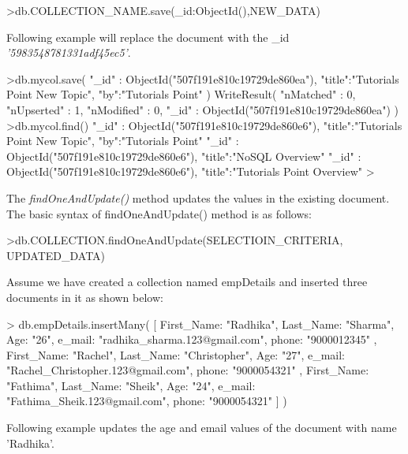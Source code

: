 \documentclass[12pt]{article}
\begin{document}
\begin{bashcode}
>db.COLLECTION_NAME.save({_id:ObjectId(),NEW_DATA})
\end{bashcode}
Following example will replace the document with the \_id
\emph{'5983548781331adf45ec5'}.

\begin{bashcode}
>db.mycol.save(
   {
      "_id" : ObjectId("507f191e810c19729de860ea"), 
        "title":"Tutorials Point New Topic",
      "by":"Tutorials Point"
   }
)
WriteResult({
    "nMatched" : 0,
    "nUpserted" : 1,
    "nModified" : 0,
    "_id" : ObjectId("507f191e810c19729de860ea")
})
>db.mycol.find()
{ "_id" : ObjectId("507f191e810c19729de860e6"), "title":"Tutorials Point New Topic",
   "by":"Tutorials Point"}
{ "_id" : ObjectId("507f191e810c19729de860e6"), "title":"NoSQL Overview"}
{ "_id" : ObjectId("507f191e810c19729de860e6"), "title":"Tutorials Point Overview"}
>
\end{bashcode}

The \emph{findOneAndUpdate()} method updates the values in the existing
document. The basic syntax of findOneAndUpdate() method is as follows:

\begin{bashcode}
>db.COLLECTION.findOneAndUpdate(SELECTIOIN_CRITERIA, UPDATED_DATA)
\end{bashcode}

Assume we have created a collection named empDetails and inserted three
documents in it as shown below:

\begin{bashcode}
> db.empDetails.insertMany(
    [
        {
            First_Name: "Radhika",
            Last_Name: "Sharma",
            Age: "26",
            e_mail: "radhika_sharma.123@gmail.com",
            phone: "9000012345"
        },
        {
            First_Name: "Rachel",
            Last_Name: "Christopher",
            Age: "27",
            e_mail: "Rachel_Christopher.123@gmail.com",
            phone: "9000054321"
        },
        {
            First_Name: "Fathima",
            Last_Name: "Sheik",
            Age: "24",
            e_mail: "Fathima_Sheik.123@gmail.com",
            phone: "9000054321"
        }
    ]
)
\end{bashcode}

Following example updates the age and email values of the document with
name 'Radhika'.

\end{document}
